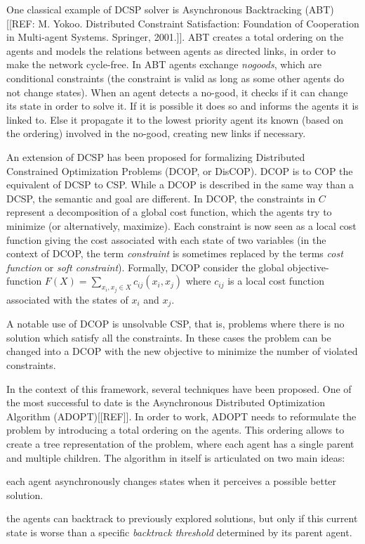 One classical example of DCSP solver is Asynchronous Backtracking (ABT)[[REF: M. Yokoo. Distributed Constraint Satisfaction: Foundation of Cooperation in Multi-agent Systems. Springer, 2001.]]. ABT creates a total ordering on the agents and models the relations between agents as directed links, in order to make the network cycle-free. In ABT agents exchange \emph{nogoods}, which are conditional constraints (the constraint is valid as long as some other agents do not change states). When an agent detects a no-good, it checks if it can change its state in order to solve it. If it is possible it does so and informs the agents it is linked to. Else it propagate it to the lowest priority agent its known (based on the ordering) involved in the no-good, creating new links if necessary.

An extension of DCSP has been proposed for formalizing Distributed Constrained Optimization Problems (DCOP, or DisCOP). DCOP is to COP the equivalent of DCSP to CSP. While a DCOP is described in the same way than a DCSP, the semantic and goal are different.
In DCOP, the constraints in $C$ represent a decomposition of a global cost function, which the agents try to minimize (or alternatively, maximize). Each constraint is now seen as a local cost function giving the cost associated with each state of two variables (in the context of DCOP, the term \emph{constraint} is sometimes replaced by the terms \emph{cost function} or \emph{soft constraint}). Formally, DCOP consider the global objective-function $F(X) = \sum_{x_i, x_j \in X} c_{ij}(x_i,x_j)$ where $c_{ij}$ is a local cost function associated with the states of $x_i$ and $x_j$.

A notable use of DCOP is unsolvable CSP, that is, problems where there is no solution which satisfy all the constraints. In these cases the problem can be changed into a DCOP with the new objective to minimize the number of violated constraints.

In the context of this framework, several techniques have been proposed. One of the most successful to date is the Asynchronous Distributed Optimization Algorithm (ADOPT)[[REF]]. In order to work, ADOPT needs to reformulate the problem by introducing a total ordering on the agents. This ordering allows to create a tree representation of the problem, where each agent has a single parent and multiple children. The algorithm in itself is articulated on two main ideas:
\begin{compactitem}
\item each agent asynchronously changes states when it perceives a possible better solution.
\item the agents can backtrack to previously explored solutions, but only if this current state is worse than a specific \emph{backtrack threshold} determined by its parent agent.
\end{compactitem}

